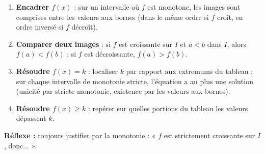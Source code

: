 \documentclass[11pt]{article}
\begin{document}
\begin{methode}
\begin{enumerate}
\item \textbf{Encadrer $f(x)$} : sur un intervalle où $f$ est monotone, les images sont comprises entre les valeurs aux bornes (dans le même ordre si $f$ croît, en ordre inversé si $f$ décroît).
\item \textbf{Comparer deux images} : si $f$ est croissante sur $I$ et $a < b$ dans $I$, alors $f(a) < f(b)$ ; si $f$ est décroissante, $f(a) > f(b)$.
\item \textbf{Résoudre $f(x) = k$} : localiser $k$ par rapport aux extremums du tableau ; sur chaque intervalle de monotonie stricte, l'équation a au plus une solution (unicité par stricte monotonie, existence par les valeurs aux bornes).
\item \textbf{Résoudre $f(x) \geq k$} : repérer sur quelles portions du tableau les valeurs dépassent $k$.
\end{enumerate}
\textbf{Réflexe :} toujours justifier par la monotonie : « $f$ est strictement croissante sur $I$, donc... ».
\end{methode}
\end{document}
